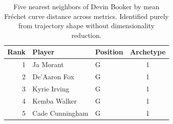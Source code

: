 \begin{table}[htbp]
  \centering\small
  \begin{tabular}{rllc}
    \toprule
    Rank & Player & Position & Archetype \\
    \midrule
    1 & Ja Morant & G & 1 \\
    2 & De'Aaron Fox & G & 1 \\
    3 & Kyrie Irving & G & 1 \\
    4 & Kemba Walker & G & 1 \\
    5 & Cade Cunningham & G & 1 \\
    \bottomrule
  \end{tabular}
  \caption{Five nearest neighbors of Devin Booker by mean Fr\'{e}chet curve distance across metrics. Identified purely from trajectory shape without dimensionality reduction.}
  \label{tab:Devin_Booker_frechet_curve_neighbors}
\end{table}

